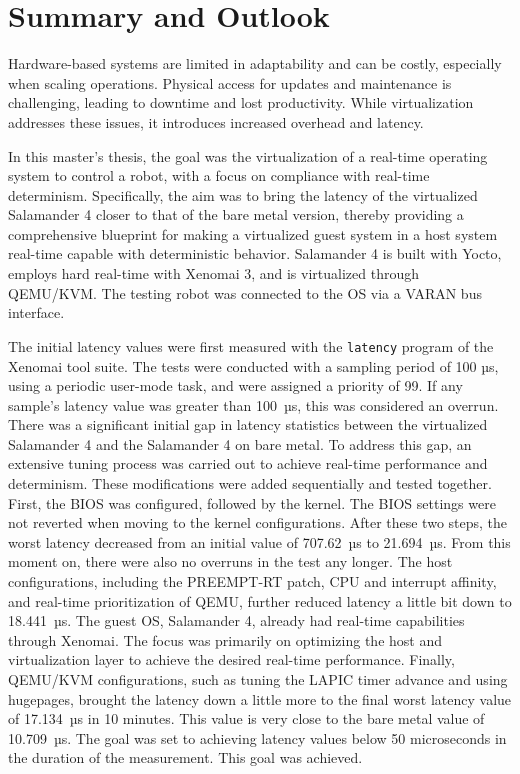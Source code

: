 \documentclass[MMR,Master,english]{style/twbook}
\begin{document}
\clearpage

\chapter{Summary and Outlook}\label{cha:summary_and_outlook}
Hardware-based systems are limited in adaptability and can be costly, especially when scaling operations. Physical access for updates and maintenance is challenging, leading to downtime and lost productivity. While virtualization addresses these issues, it introduces increased overhead and latency.

\bigskip \noindent In this master's thesis, the goal was the virtualization of a real-time operating system to control a robot, with a focus on compliance with real-time determinism. Specifically, the aim was to bring the latency of the virtualized Salamander 4 closer to that of the bare metal version, thereby providing a comprehensive blueprint for making a virtualized guest system in a host system real-time capable with deterministic behavior. Salamander 4 is built with Yocto, employs hard real-time with Xenomai 3, and is virtualized through QEMU/KVM. The testing robot was connected to the OS via a VARAN bus interface.

\bigskip \noindent The initial latency values were first measured with the \texttt{latency} program of the Xenomai tool suite. The tests were conducted with a sampling period of 100 µs, using a periodic user-mode task, and were assigned a priority of 99. If any sample's latency value was greater than 100~µs, this was considered an overrun. There was a significant initial gap in latency statistics between the virtualized Salamander 4 and the Salamander 4 on bare metal. To address this gap, an extensive tuning process was carried out to achieve real-time performance and determinism. These modifications were added sequentially and tested together. First, the BIOS was configured, followed by the kernel. The BIOS settings were not reverted when moving to the kernel configurations. After these two steps, the worst latency decreased from an initial value of 707.62~µs to 21.694~µs. From this moment on, there were also no overruns in the test any longer. The host configurations, including the PREEMPT-RT patch, CPU and interrupt affinity, and real-time prioritization of QEMU, further reduced latency a little bit down to 18.441~µs. The guest OS, Salamander 4, already had real-time capabilities through Xenomai. The focus was primarily on optimizing the host and virtualization layer to achieve the desired real-time performance. Finally, QEMU/KVM configurations, such as tuning the LAPIC timer advance and using hugepages, brought the latency down a little more to the final worst latency value of 17.134~µs in 10 minutes. This value is very close to the bare metal value of 10.709~µs. The goal was set to achieving latency values below 50 microseconds in the duration of the measurement. This goal was achieved.
\end{document}
